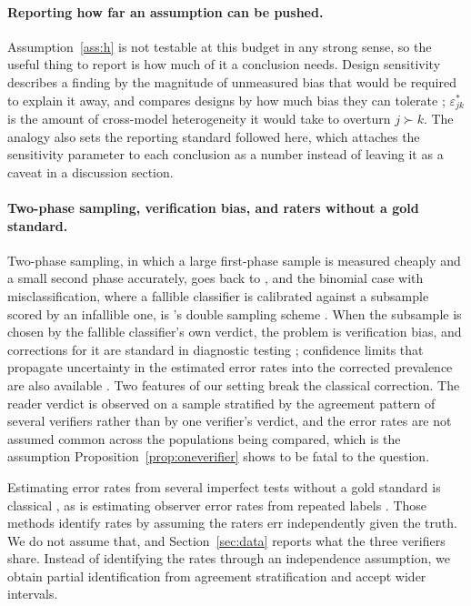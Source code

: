 \paragraph{Reporting how far an assumption can be pushed.}
Assumption~\ref{ass:h} is not testable at this budget in any strong sense, so the useful thing to
report is how much of it a conclusion needs. Design sensitivity describes a finding by the
magnitude of unmeasured bias that would be required to explain it away, and compares designs by
how much bias they can tolerate \citep{rosenbaum2004design}; $\varepsilon^{*}_{jk}$ is the amount
of cross-model heterogeneity it would take to overturn $j \succ k$. The analogy also sets the
reporting standard followed here, which attaches the sensitivity parameter to each conclusion as
a number instead of leaving it as a caveat in a discussion section.

\paragraph{Two-phase sampling, verification bias, and raters without a gold standard.}
Two-phase sampling, in which a large first-phase sample is measured cheaply and a small second
phase accurately, goes back to \citet{neyman1938contribution}, and the binomial case with
misclassification, where a fallible classifier is calibrated against a subsample scored by an
infallible one, is \citeauthor{tenenbein1970double}'s double sampling scheme
\citep{tenenbein1970double}. When the subsample is chosen by the fallible classifier's own
verdict, the problem is verification bias, and corrections for it are standard in diagnostic
testing \citep{begg1983assessment}; confidence limits that propagate uncertainty in the
estimated error rates into the corrected prevalence are also available \citep{lang2014confidence}.
Two features of our setting break the classical correction. The reader verdict is observed on a
sample stratified by the agreement pattern of several verifiers rather than by one verifier's
verdict, and the error rates are not assumed common across the populations being compared, which
is the assumption Proposition~\ref{prop:oneverifier} shows to be fatal to the question.

Estimating error rates from several imperfect tests without a gold standard is classical
\citep{hui1980estimating}, as is estimating observer error rates from repeated labels
\citep{dawid1979maximum}. Those methods identify rates by assuming the raters err independently
given the truth. We do not assume that, and Section~\ref{sec:data} reports what the three
verifiers share. Instead of identifying the rates through an independence assumption, we obtain
partial identification from agreement stratification and accept wider intervals.

